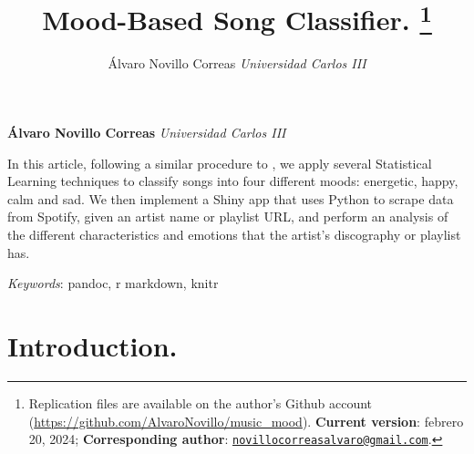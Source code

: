 \documentclass[11pt,]{article}
\title{Mood-Based Song Classifier. \thanks{Replication files are
available on the author's Github account
(\url{https://github.com/AlvaroNovillo/music_mood}). \textbf{Current
version}: febrero 20, 2024; \textbf{Corresponding author}:
\href{mailto:novillocorreasalvaro@gmail.com}{\nolinkurl{novillocorreasalvaro@gmail.com}}.}  }
\author{\Large Álvaro Novillo
Correas\vspace{0.05in} \newline\normalsize\emph{Universidad Carlos
III}  }
\date{}
\newcommand*{\authorfont}{\fontfamily{phv}\selectfont}
\renewenvironment{abstract}
 {{%
    \setlength{\leftmargin}{0mm}
    \setlength{\rightmargin}{\leftmargin}%
  }%
  \relax}
 {\endlist}
\begin{document}
%

{%
\setlength{\parindent}{0pt}
\thispagestyle{plain}
{\fontsize{18}{20}\selectfont\raggedright
\maketitle  %

}

{
   \vskip 13.5pt\relax \normalsize\fontsize{11}{12}
\textbf{\authorfont Álvaro Novillo
Correas} \hskip 15pt \emph{\small Universidad Carlos III}   

}

}








\begin{abstract}

    \hbox{\vrule height .2pt width 39.14pc}

    \vskip 8.5pt %

\noindent In this article, following a similar procedure to
\citep{data1}, we apply several Statistical Learning techniques to
classify songs into four different moods: energetic, happy, calm and
sad. We then implement a Shiny app that uses Python to scrape data from
Spotify, given an artist name or playlist URL, and perform an analysis
of the different characteristics and emotions that the artist's
discography or playlist has.


\vskip 8.5pt \noindent \emph{Keywords}: pandoc, r markdown, knitr \par

    \hbox{\vrule height .2pt width 39.14pc}



\end{abstract}


\vskip -8.5pt



\noindent 

\hypertarget{introduction.}{%
\section{Introduction.}\label{introduction.}}
\end{document}

